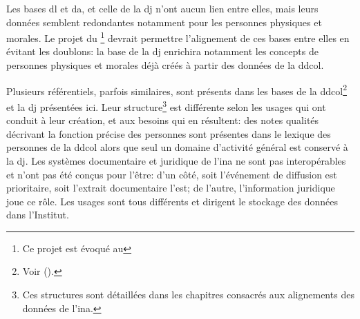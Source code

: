 Les bases \ac{dl} et \ac{da}, et celle de la \ac{dj} n'ont aucun lien entre elles, mais leurs données semblent redondantes notamment pour les personnes physiques et morales. Le projet du \ldd\footnote{Ce projet est évoqué au } devrait permettre l'alignement de ces bases entre elles en évitant les doublons: la base de la \ac{dj} enrichira notamment les concepts de personnes physiques et morales déjà créés à partir des données de la \ac{ddcol}.

\bigskip
\bigskip

Plusieurs référentiels, parfois similaires, sont présents dans les bases de la \ac{ddcol}\footnote{Voir  ().} et la \ac{dj} présentées ici. Leur structure\footnote{Ces structures sont détaillées dans les chapitres consacrés aux alignements des données de l'\ac{ina}.} est différente selon les usages qui ont conduit à leur création, et aux besoins qui en résultent: des notes qualités décrivant la fonction précise des personnes sont présentes dans le lexique des personnes de la \ac{ddcol} alors que seul un domaine d'activité général est conservé à la \ac{dj}. Les systèmes documentaire et juridique de l'\ac{ina} ne sont pas interopérables et n'ont pas été conçus pour l'être: d'un côté, soit l'événement de diffusion est prioritaire, soit l'extrait documentaire l'est; de l'autre, l'information juridique joue ce rôle. Les usages sont tous différents et dirigent le stockage des données dans l'Institut.